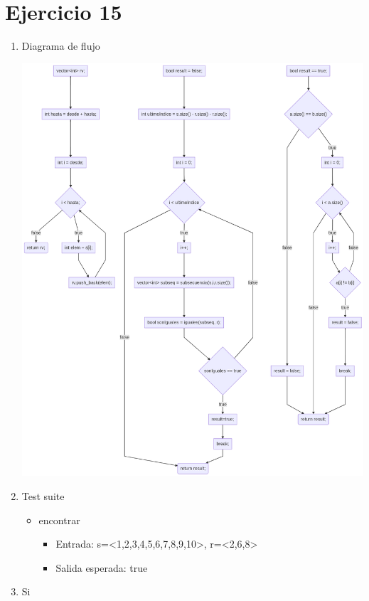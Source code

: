 \documentclass{article}
\begin{document}
\section*{Ejercicio 15}

\begin{enumerate}
    \item Diagrama de flujo
    
    \includegraphics[scale=0.35]{recursos/esSubSecuencia.png}

    \item Test suite
        \begin{itemize}
            \item encontrar
                \begin{itemize}
                    \item Entrada: s=<1,2,3,4,5,6,7,8,9,10>, r=<2,6,8>
                    \item Salida esperada: true
                \end{itemize}
        \end{itemize}
    \item Si
\end{enumerate}
\end{document}
